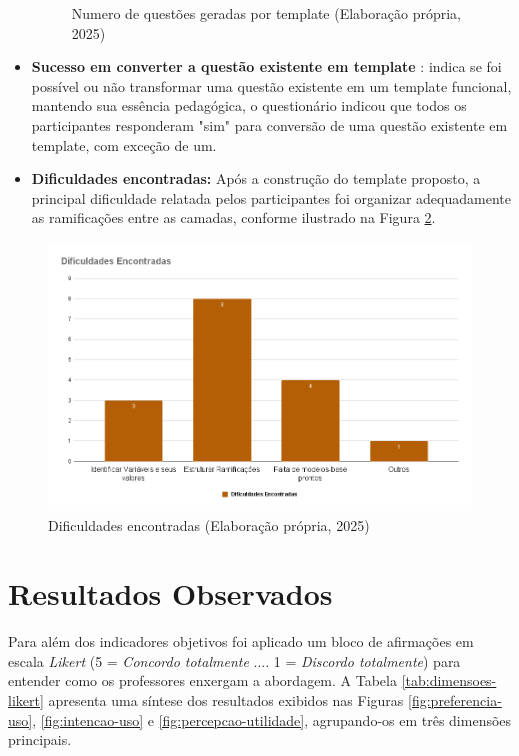\begin{itemize}
\begin{figure}[ht]
	\caption{Numero de questões geradas por template (Elaboração própria, 2025) }
	\label{fig:questoes-geradas}
\end{figure}
        \item  \textbf{Sucesso em converter a questão existente em template }: indica se foi possível ou não transformar uma questão existente em um template funcional, mantendo sua essência pedagógica, o questionário indicou que todos os participantes responderam "sim" para conversão de uma questão existente em template, com exceção de um. 
        \item \textbf{Dificuldades encontradas:} Após a construção do template proposto, a principal dificuldade relatada pelos participantes foi organizar adequadamente as ramificações entre as camadas, conforme ilustrado na Figura \ref{fig:dificuldades-encontradas}.  
    \end{itemize}


\begin{figure}[ht]
	\centering
	\includegraphics[width=14cm]{./imagens/capitulo8/dificuldades-encontradas}
	\caption{Dificuldades encontradas  (Elaboração própria, 2025) }
	\label{fig:dificuldades-encontradas}
\end{figure}



\section{Resultados Observados}

Para além dos indicadores objetivos foi aplicado um bloco de afirmações em escala \textit{Likert} (5 = \textit{Concordo totalmente} .... 1 = \textit{Discordo totalmente})  para entender como os professores enxergam a abordagem. A Tabela \ref{tab:dimensoes-likert} apresenta uma síntese dos resultados exibidos nas Figuras \ref{fig:preferencia-uso}, \ref{fig:intencao-uso} e \ref{fig:percepcao-utilidade}, agrupando-os em três dimensões principais.

